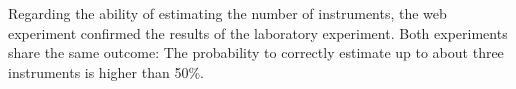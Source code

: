 
\par
Regarding the ability of estimating the number of instruments, the web experiment confirmed the results of the laboratory experiment\cite{Stoter2013}. Both experiments share the same outcome: The probability to correctly estimate up to about three instruments is higher than 50\%.

